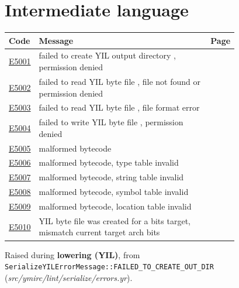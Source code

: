 
\clearpage
\section{Intermediate language}
\label{sec:codes:yil}

\begin{longtable}{@{}l p{0.78\linewidth} r@{}}
\toprule Code & Message & Page\\ \midrule \endhead
\hyperref[sec:codes:e5001]{E5001} & failed to create YIL output directory \errhole{}, permission denied & \pageref{sec:codes:e5001}\\
\hyperref[sec:codes:e5002]{E5002} & failed to read YIL byte file \errhole{}, file not found or permission denied & \pageref{sec:codes:e5002}\\
\hyperref[sec:codes:e5003]{E5003} & failed to read YIL byte file \errhole{}, file format error & \pageref{sec:codes:e5003}\\
\hyperref[sec:codes:e5004]{E5004} & failed to write YIL byte file \errhole{}, permission denied & \pageref{sec:codes:e5004}\\
\hyperref[sec:codes:e5005]{E5005} & malformed bytecode & \pageref{sec:codes:e5005}\\
\hyperref[sec:codes:e5006]{E5006} & malformed bytecode, type table invalid & \pageref{sec:codes:e5006}\\
\hyperref[sec:codes:e5007]{E5007} & malformed bytecode, string table invalid & \pageref{sec:codes:e5007}\\
\hyperref[sec:codes:e5008]{E5008} & malformed bytecode, symbol table invalid & \pageref{sec:codes:e5008}\\
\hyperref[sec:codes:e5009]{E5009} & malformed bytecode, location table invalid & \pageref{sec:codes:e5009}\\
\hyperref[sec:codes:e5010]{E5010} & YIL byte file was created for a \errhole{} bits target, mismatch current target arch \errhole{} bits & \pageref{sec:codes:e5010}\\
\bottomrule
\end{longtable}

\label{sec:codes:e5001}

Raised during \textbf{lowering (YIL)}, from \texttt{SerializeYILErrorMessage::\allowbreak{}FAILED\_\allowbreak{}TO\_\allowbreak{}CREATE\_\allowbreak{}OUT\_\allowbreak{}DIR} (\textit{src/\allowbreak{}ymirc/\allowbreak{}lint/\allowbreak{}serialize/\allowbreak{}errors.yr}).

